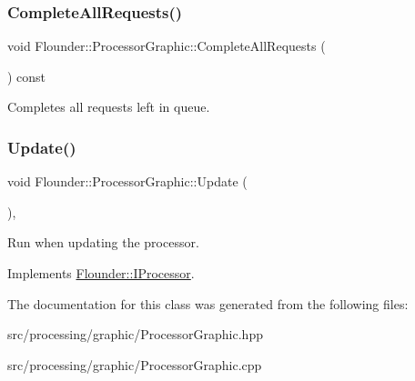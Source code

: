 \subsubsection{\texorpdfstring{Complete\+All\+Requests()}{CompleteAllRequests()}}
{\footnotesize\ttfamily void Flounder\+::\+Processor\+Graphic\+::\+Complete\+All\+Requests (\begin{DoxyParamCaption}{ }\end{DoxyParamCaption}) const}



Completes all requests left in queue. 

\mbox{\label{class_flounder_1_1_processor_graphic_a54cb1365a43270193275ce3794b03b2e}} 
\subsubsection{\texorpdfstring{Update()}{Update()}}
{\footnotesize\ttfamily void Flounder\+::\+Processor\+Graphic\+::\+Update (\begin{DoxyParamCaption}{ }\end{DoxyParamCaption})\hspace{0.3cm}{\ttfamily [override]}, {\ttfamily [virtual]}}



Run when updating the processor. 



Implements \hyperlink{class_flounder_1_1_i_processor_ade1b8614d9e1b62ad66887426701a5d4}{Flounder\+::\+I\+Processor}.



The documentation for this class was generated from the following files\+:\begin{DoxyCompactItemize}
\item 
src/processing/graphic/Processor\+Graphic.\+hpp\item 
src/processing/graphic/Processor\+Graphic.\+cpp\end{DoxyCompactItemize}

